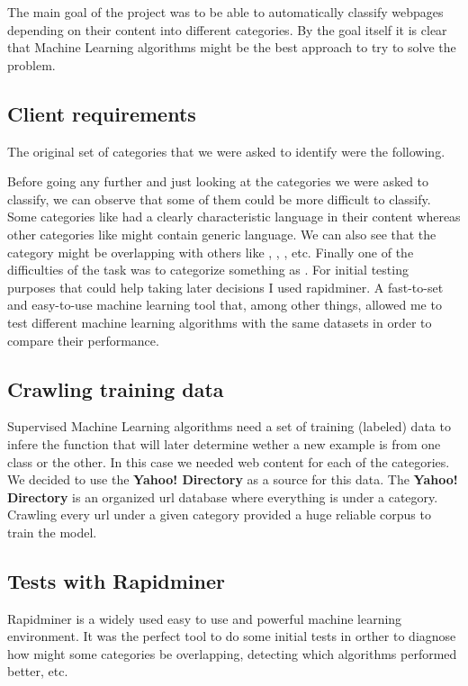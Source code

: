 
The main goal of the project was to be able to automatically classify webpages depending on their content into different categories. 
By the goal itself it is clear that Machine Learning algorithms might be the best approach to try to solve the problem. 

\subsection{Client requirements}

The original set of categories that we were asked to identify were the following.


Before going any further and just looking at the categories we were asked to classify, we can observe that some of them could be more difficult to classify.
Some categories like  had a clearly characteristic language in their content whereas other categories like  might contain generic language.
We can also see that the category  might be overlapping with others like , , , etc. 
Finally one of the difficulties of the task was to categorize something as . 
For initial testing purposes that could help taking later decisions I used rapidminer. A fast-to-set and easy-to-use machine learning tool that, among other things, allowed me to test different
machine learning algorithms with the same datasets in order to compare their performance.

\subsection{Crawling training data}
Supervised Machine Learning algorithms need a set of training (labeled) data to infere the function that will later determine wether a new example is from one class or the other. In this case we needed
web content for each of the categories. We decided to use the {\bf Yahoo! Directory}\cite{yahoo} as a source for this data.
The {\bf Yahoo! Directory} is an organized url database where everything is under a category. Crawling every url under a given category provided a huge reliable corpus to train the model.

  


\subsection{Tests with Rapidminer}
Rapidminer\cite{rapidminer} is a widely used easy to use and powerful machine learning environment.  
It was the perfect tool to do some initial tests in orther to diagnose how might some categories be overlapping, detecting which algorithms performed better, etc.

